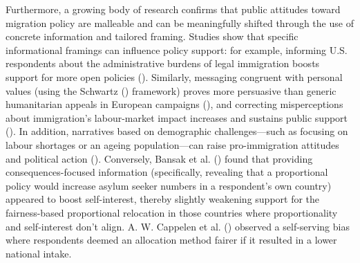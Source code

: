 \documentclass[
  12pt,
  a4paper,
]{article}
\begin{document}
Furthermore, a growing body of research confirms that public attitudes toward migration policy are malleable and can be meaningfully shifted through the use of concrete information and tailored framing. Studies show that specific informational framings can influence policy support: for example, informing U.S. respondents about the administrative burdens of legal immigration boosts support for more open policies (). Similarly, messaging congruent with personal values (using the Schwartz () framework) proves more persuasive than generic humanitarian appeals in European campaigns (), and correcting misperceptions about immigration's labour-market impact increases and sustains public support (). In addition, narratives based on demographic challenges---such as focusing on labour shortages or an ageing population---can raise pro-immigration attitudes and political action (). Conversely, Bansak et al. () found that providing consequences-focused information (specifically, revealing that a proportional policy would increase asylum seeker numbers in a respondent's own country) appeared to boost self-interest, thereby slightly weakening support for the fairness-based proportional relocation in those countries where proportionality and self-interest don't align. A. W. Cappelen et al. () observed a self-serving bias where respondents deemed an allocation method fairer if it resulted in a lower national intake.
\end{document}
